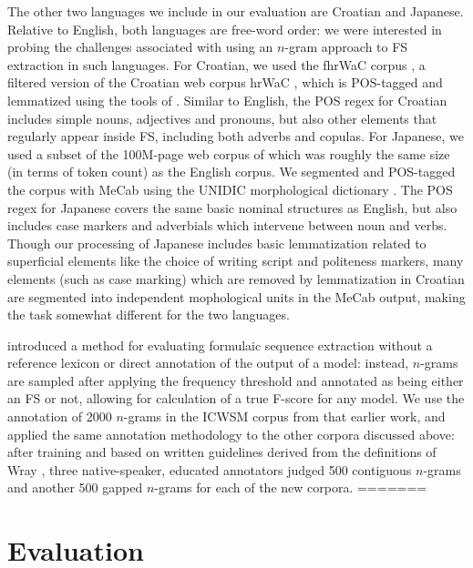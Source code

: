 \documentclass[11pt,letterpaper]{article}
\begin{document}
The other two languages we include in our evaluation are Croatian and Japanese. Relative to English, both languages are free-word order: we were interested in probing the challenges associated with using an $n$-gram approach to FS extraction in such languages. For Croatian, we used the fhrWaC corpus \cite{snajder2013building}, a filtered version of the Croatian web corpus hrWaC , which is POS-tagged and lemmatized using the tools of . Similar to English, the POS regex for Croatian includes simple nouns, adjectives and pronouns, but also other elements that regularly appear inside FS, including both adverbs and copulas. For Japanese, we used a subset of the 100M-page web corpus of  which was roughly the same size (in terms of token count) as the English corpus. We segmented and POS-tagged the corpus with MeCab \cite{Kudo:2008} using the UNIDIC morphological dictionary \cite{Den:2007}. The POS regex for Japanese covers the same basic nominal structures as English, but also includes case markers and adverbials which intervene between noun and verbs. Though our processing of Japanese includes basic lemmatization related to superficial elements like the choice of writing script and politeness markers, many elements (such as case marking) which are removed by lemmatization in Croatian are segmented into independent mophological units in the MeCab output, making the task somewhat different for the two languages.


 introduced a method for evaluating formulaic sequence extraction without a reference lexicon or direct annotation of the output of a model: instead, $n$-grams are sampled after applying the frequency threshold and annotated as being either an FS or not, allowing for calculation of a true F-score for any model. We use the annotation of 2000 $n$-grams in the ICWSM corpus from that earlier work, and applied the same annotation methodology to the other corpora discussed above: after training and based on written guidelines derived from the definitions of Wray \cite{Wray08}, three native-speaker, educated annotators judged 500 contiguous $n$-grams and another 500 gapped $n$-grams for each of the new corpora. 
=======
\section{Evaluation} 
\label{sec:evaluation}
\end{document}
